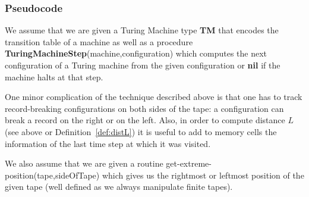 \subsubsection{Pseudocode}

We assume that we are given a Turing Machine type \textbf{TM} that encodes the transition table of a machine as well as a procedure \textbf{TuringMachineStep}(machine,configuration) which computes the next configuration of a Turing machine from the given configuration or \textbf{nil} if the machine halts at that step.

One minor complication of the technique described above is that one has to track record-breaking configurations on both sides of the tape: a configuration can break a record on the right or on the left. Also, in order to compute distance $L$ (see above or Definition~\ref{def:distL}) it is useful to add to memory cells the information of the last time step at which it was visited.

We also assume that we are given a routine {\sc get-extreme-position}(tape,sideOfTape) which gives us the rightmost or leftmost position of the given tape (well defined as we always manipulate finite tapes).

